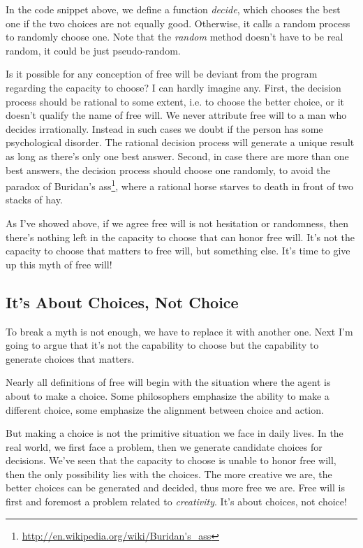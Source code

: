 In the code snippet above, we define a function \emph{decide}, which chooses the best one if the two choices are not equally good. Otherwise, it calls a random process to randomly choose one. Note that the \emph{random} method doesn't have to be real random, it could be just pseudo-random.

Is it possible for any conception of free will be deviant from the program regarding the capacity to choose? I can hardly imagine any. First, the decision process should be rational to some extent, i.e. to choose the better choice, or it doesn't qualify the name of free will. We never attribute free will to a man who decides irrationally. Instead in such cases we doubt if the person has some psychological disorder. The rational decision process will generate a unique result as long as there's only one best answer. Second, in case there are more than one best answers, the decision process should choose one randomly, to avoid the paradox of Buridan's ass\footnote{\url{http://en.wikipedia.org/wiki/Buridan's_ass}}, where a rational horse starves to death in front of two stacks of hay.

As I've showed above, if we agree free will is not hesitation or randomness, then there's nothing left in the capacity to choose that can honor free will. It's not the capacity to choose that matters to free will, but something else. It's time to give up this myth of free will!

\subsection{It's About Choices, Not Choice}

To break a myth is not enough, we have to replace it with another one. Next I'm going to argue that it's not the capability to choose but the capability to generate choices that matters.

Nearly all definitions of free will begin with the situation where the agent is about to make a choice. Some philosophers emphasize the ability to make a different choice, some emphasize the alignment between choice and action.

But making a choice is not the primitive situation we face in daily lives. In the real world, we first face a problem, then we generate candidate choices for decisions. We've seen that the capacity to choose is unable to honor free will, then the only possibility lies with the choices. The more creative we are, the better choices can be generated and decided, thus more free we are. Free will is first and foremost a problem related to \emph{creativity}. It's about choices, not choice!

